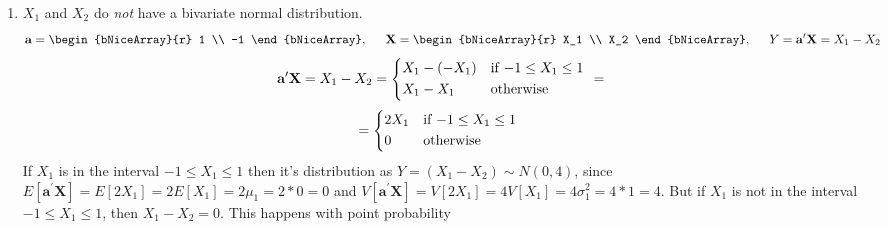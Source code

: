 \begin{enumerate}[label= (\alph*)]
    \item $X_1$ and $X_2$ do \textit{not} have a bivariate normal distribution.
    \[
      \textbf{a}
      =
      \begin{bNiceArray}{r}
        1 \\
        -1
      \end{bNiceArray}
      ,\hspace{0.2in}
      \textbf{X}
      =
      \begin{bNiceArray}{r}
        X_1 \\
        X_2
      \end{bNiceArray}
      ,\hspace{0.2in}
      Y
      =
      \textbf{a}^{\prime}
      \textbf{X}
      =
      X_1 - X_2
    \]
    \[
        \textbf{a}^{\prime}
        \textbf{X}
      =
        X_1 - X_2
      =
      \begin{cases*}
        X_1 - (-X_1) & if $-1 \leq X_1 \leq 1$ \\
        X_1 - X_1 & otherwise
      \end{cases*}
      =
    \]
    \[
      =
      \begin{cases*}
        2X_1 & if $-1 \leq X_1 \leq 1$ \\
        0 & otherwise
      \end{cases*}
    \]
    If $X_1$ is in the interval $-1 \leq X_1 \leq 1$ then it's distribution as $ Y = (X_1 - X_2) \sim N(0,4)$, since $E[\textbf{a}^{\prime}\textbf{X}] = E[2X_1] = 2E[X_1]=2\mu_1=2*0 = 0$ and $V[\textbf{a}^{\prime}\textbf{X}] = V[2X_1] = 4V[X_1] = 4\sigma_1^2 = 4*1 = 4$.
    But if $X_1$ is not in the interval $-1 \leq X_1 \leq 1$, then $X_1 - X_2 = 0$. This happens with point probability


\end{enumerate}
